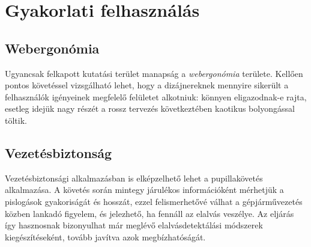 \section{Gyakorlati felhasználás}\label{sect:gyakorlati}


\subsection{Webergonómia}\label{sect:webergonomia}

Ugyancsak felkapott kutatási terület manapság a \emph{webergonómia} területe. Kellően pontos követéssel vizsgálható lehet, hogy a dizájnereknek mennyire sikerült a felhasználók igényeinek megfelelő felületet alkotniuk: könnyen eligazodnak-e rajta, esetleg idejük nagy részét a rossz tervezés következtében kaotikus bolyongással töltik.

\subsection{Vezetésbiztonság}\label{sect:orvosi_felhasznalas}

Vezetésbiztonsági alkalmazásban is elképzelhető lehet a pupillakövetés alkalmazása. A követés során mintegy járulékos információként mérhetjük a pislogások gyakoriságát és hosszát, ezzel felismerhetővé válhat a gépjárművezetés közben lankadó figyelem, és jelezhető, ha fennáll az elalvás veszélye. Az eljárás így hasznosnak bizonyulhat már meglévő elalvásdetektálási módszerek \cite{sleepdet} kiegészítéseként, tovább javítva azok megbízhatóságát.


